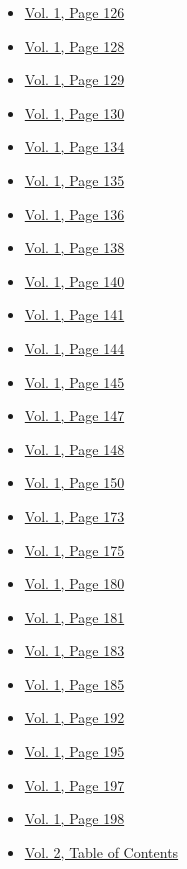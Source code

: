\begin{itemize}
\begin{itemize}
  \item
    \protect\hyperlink{g-page-134}{Vol. 1, Page 126}
  \item
    \protect\hyperlink{g-page-136}{Vol. 1, Page 128}
  \item
    \protect\hyperlink{g-page-137}{Vol. 1, Page 129}
  \item
    \protect\hyperlink{g-page-138}{Vol. 1, Page 130}
  \item
    \protect\hyperlink{g-page-142}{Vol. 1, Page 134}
  \item
    \protect\hyperlink{g-page-143}{Vol. 1, Page 135}
  \item
    \protect\hyperlink{g-page-144}{Vol. 1, Page 136}
  \item
    \protect\hyperlink{g-page-146}{Vol. 1, Page 138}
  \item
    \protect\hyperlink{g-page-148}{Vol. 1, Page 140}
  \item
    \protect\hyperlink{g-page-149}{Vol. 1, Page 141}
  \item
    \protect\hyperlink{g-page-152}{Vol. 1, Page 144}
  \item
    \protect\hyperlink{g-page-153}{Vol. 1, Page 145}
  \item
    \protect\hyperlink{g-page-155}{Vol. 1, Page 147}
  \item
    \protect\hyperlink{g-page-156}{Vol. 1, Page 148}
  \item
    \protect\hyperlink{g-page-158}{Vol. 1, Page 150}
  \item
    \protect\hyperlink{g-page-181}{Vol. 1, Page 173}
  \item
    \protect\hyperlink{g-page-183}{Vol. 1, Page 175}
  \item
    \protect\hyperlink{g-page-188}{Vol. 1, Page 180}
  \item
    \protect\hyperlink{g-page-189}{Vol. 1, Page 181}
  \item
    \protect\hyperlink{g-page-191}{Vol. 1, Page 183}
  \item
    \protect\hyperlink{g-page-193}{Vol. 1, Page 185}
  \item
    \protect\hyperlink{g-page-200}{Vol. 1, Page 192}
  \item
    \protect\hyperlink{g-page-203}{Vol. 1, Page 195}
  \item
    \protect\hyperlink{g-page-205}{Vol. 1, Page 197}
  \item
    \protect\hyperlink{g-page-206}{Vol. 1, Page 198}
  \item
    \protect\hyperlink{g-page-209}{Vol. 2, Table of Contents}

\end{itemize}
\end{itemize}
